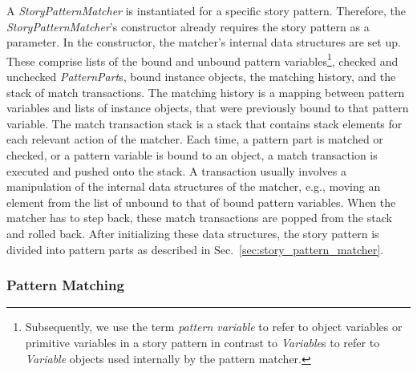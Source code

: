 A \emph{StoryPatternMatcher} is instantiated for a specific story pattern. 
Therefore, the \emph{StoryPatternMatcher}'s constructor already requires the story pattern as a parameter.
In the constructor, the matcher's internal data structures are set up. 
These comprise lists of the bound and unbound pattern variables\footnote{Subsequently, we use the term \emph{pattern variable} to refer to object variables or primitive variables in a story pattern in contrast to \emph{Variable}s to refer to \emph{Variable} objects used internally by the pattern matcher.}, checked and unchecked \emph{PatternPart}s, bound instance objects, the matching history, and the stack of match transactions.
The matching history is a mapping between pattern variables and lists of instance objects, that were previously bound to that pattern variable.
The match transaction stack is a stack that contains stack elements for each relevant action of the matcher.
Each time, a pattern part is matched or checked, or a pattern variable is bound to an object, a match transaction is executed and pushed onto the stack.
A transaction usually involves a manipulation of the internal data structures of the matcher, e.g., moving an element from the list of unbound to that of bound pattern variables.
When the matcher has to step back, these match transactions are popped from the stack and rolled back.
After initializing these data structures, the story pattern is divided into pattern parts as described in Sec.~\ref{sec:story_pattern_matcher}.


\subsubsection{Pattern Matching}
\label{sec:spm_pattern_matching}

\lstset{
	numbers=left
}

